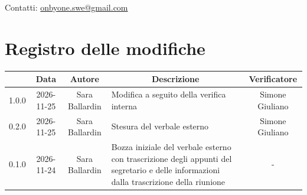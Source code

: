 \documentclass[11pt, a4paper]{article}
\begin{document}
\begin{titlepage}
    \vspace{0.5cm}
    
    {\large Contatti: \href{mailto:onbyone.swe@gmail.com}{onbyone.swe@gmail.com} }
    
\end{titlepage}

\newpage

\section*{Registro delle modifiche}

\vspace{1cm}
\begin{center}
    \renewcommand{\arraystretch}{1.5}
    \begin{tabularx}{\textwidth}{|c|c|c|X|c|}
        \hline
        \rowcolor{gray!10} 
        \multicolumn{1}{|c|}{\textbf{Versione}} & 
        \multicolumn{1}{c|}{\textbf{Data}} & 
        \multicolumn{1}{c|}{\textbf{Autore}} & 
        \multicolumn{1}{c|}{\textbf{Descrizione}} & 
        \multicolumn{1}{c|}{\textbf{Verificatore}} \\
        \hline
        1.0.0 & 2026-11-25 & Sara Ballardin & Modifica a seguito della verifica interna & Simone Giuliano \\
        \hline
        0.2.0 & 2026-11-25 & Sara Ballardin & Stesura del verbale esterno & Simone Giuliano \\
        \hline
        0.1.0 & 2026-11-24 & Sara Ballardin & Bozza iniziale del verbale esterno con trascrizione degli appunti del segretario e delle informazioni dalla trascrizione della riunione & - \\
        \hline
    \end{tabularx}
\end{center}
\vfill
\newpage

\tableofcontents
\newpage

\end{document}
